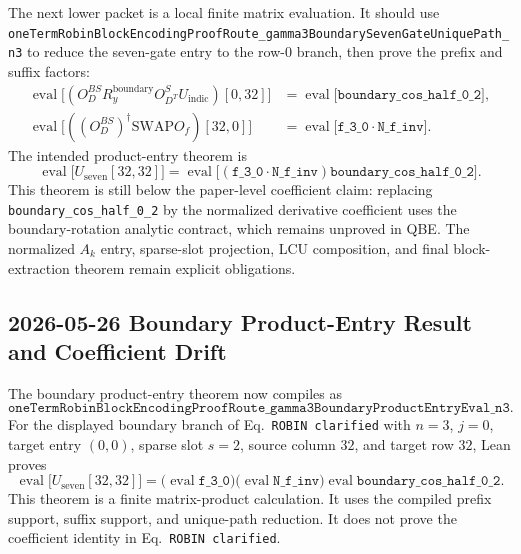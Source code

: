 The next lower packet is a local finite matrix evaluation.  It should use
\texttt{oneTermRobinBlockEncodingProofRoute\_gamma3BoundarySevenGateUniquePath\_n3}
to reduce the seven-gate entry to the row-\(0\) branch, then prove the prefix
and suffix factors:
\[
\begin{aligned}
  \operatorname{eval}\bigl[
    (O_D^{BS}R_y^{\mathrm{boundary}}O_{D^T}^{S}U_{\mathrm{indic}})[0,32]
  \bigr]
  &= \operatorname{eval}\bigl[\texttt{boundary\_cos\_half\_0\_2}\bigr],\\
  \operatorname{eval}\bigl[
    ((O_D^{BS})^\dagger\mathrm{SWAP}O_f)[32,0]
  \bigr]
  &= \operatorname{eval}\bigl[\texttt{f\_3\_0}\cdot\texttt{N\_f\_inv}\bigr].
\end{aligned}
\]
The intended product-entry theorem is
\[
\operatorname{eval}\bigl[U_{\mathrm{seven}}[32,32]\bigr]
=
\operatorname{eval}\bigl[
  (\texttt{f\_3\_0}\cdot\texttt{N\_f\_inv})
  \texttt{boundary\_cos\_half\_0\_2}
\bigr].
\]
This theorem is still below the paper-level coefficient claim: replacing
\texttt{boundary\_cos\_half\_0\_2} by the normalized derivative coefficient
uses the boundary-rotation analytic contract, which remains unproved in QBE.
The normalized \(A_k\) entry, sparse-slot projection, LCU composition, and
final block-extraction theorem remain explicit obligations.

\subsection{2026-05-26 Boundary Product-Entry Result and Coefficient Drift}

The boundary product-entry theorem now compiles as
\[
\texttt{oneTermRobinBlockEncodingProofRoute\_gamma3BoundaryProductEntryEval\_n3}.
\]
For the displayed boundary branch of Eq.~\texttt{ROBIN clarified} with
\(n=3\), \(j=0\), target entry \((0,0)\), sparse slot \(s=2\), source column
\(32\), and target row \(32\), Lean proves
\[
  \operatorname{eval}\bigl[U_{\mathrm{seven}}[32,32]\bigr]
  =
  \bigl(\operatorname{eval}\texttt{f\_3\_0}\bigr)
  \bigl(\operatorname{eval}\texttt{N\_f\_inv}\bigr)
  \operatorname{eval}\texttt{boundary\_cos\_half\_0\_2}.
\]
This theorem is a finite matrix-product calculation.  It uses the compiled
prefix support, suffix support, and unique-path reduction.  It does not prove
the coefficient identity in Eq.~\texttt{ROBIN clarified}.

